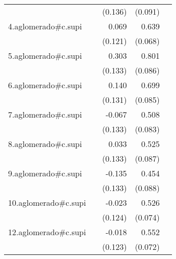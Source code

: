 {\begin{longtable}{l*{4}{D{.}{.}{-1}}}
            &                     &     (0.136)         &     (0.091)         &                     \\
\addlinespace
4.aglomerado#c.supi&                     &       0.069         &       0.639\sym{***}&                     \\
            &                     &     (0.121)         &     (0.068)         &                     \\
\addlinespace
5.aglomerado#c.supi&                     &       0.303\sym{*}  &       0.801\sym{***}&                     \\
            &                     &     (0.133)         &     (0.086)         &                     \\
\addlinespace
6.aglomerado#c.supi&                     &       0.140         &       0.699\sym{***}&                     \\
            &                     &     (0.131)         &     (0.085)         &                     \\
\addlinespace
7.aglomerado#c.supi&                     &      -0.067         &       0.508\sym{***}&                     \\
            &                     &     (0.133)         &     (0.083)         &                     \\
\addlinespace
8.aglomerado#c.supi&                     &       0.033         &       0.525\sym{***}&                     \\
            &                     &     (0.133)         &     (0.087)         &                     \\
\addlinespace
9.aglomerado#c.supi&                     &      -0.135         &       0.454\sym{***}&                     \\
            &                     &     (0.133)         &     (0.088)         &                     \\
\addlinespace
10.aglomerado#c.supi&                     &      -0.023         &       0.526\sym{***}&                     \\
            &                     &     (0.124)         &     (0.074)         &                     \\
\addlinespace
12.aglomerado#c.supi&                     &      -0.018         &       0.552\sym{***}&                     \\
            &                     &     (0.123)         &     (0.072)         &                     \\

\end{longtable}}
